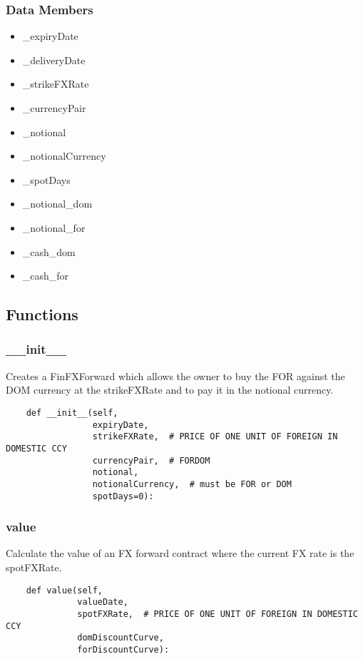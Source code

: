 \documentclass[twoside,11pt]{book}
\begin{document}
\subsubsection*{Data Members}
\begin{itemize}
\item{\_expiryDate}
\item{\_deliveryDate}
\item{\_strikeFXRate}
\item{\_currencyPair}
\item{\_notional}
\item{\_notionalCurrency}
\item{\_spotDays}
\item{\_notional\_dom}
\item{\_notional\_for}
\item{\_cash\_dom}
\item{\_cash\_for}
\end{itemize}

\subsection*{Functions}

\subsubsection*{{\bf \_\_init\_\_}}
Creates a FinFXForward which allows the owner to buy the FOR against the DOM currency at the strikeFXRate and to pay it in the notional currency.  

\begin{lstlisting}
    def __init__(self,
                 expiryDate,
                 strikeFXRate,  # PRICE OF ONE UNIT OF FOREIGN IN DOMESTIC CCY
                 currencyPair,  # FORDOM
                 notional,
                 notionalCurrency,  # must be FOR or DOM
                 spotDays=0):
\end{lstlisting}

\subsubsection*{{\bf value}}
Calculate the value of an FX forward contract where the current FX rate is the spotFXRate.  

\begin{lstlisting}
    def value(self,
              valueDate,
              spotFXRate,  # PRICE OF ONE UNIT OF FOREIGN IN DOMESTIC CCY
              domDiscountCurve,
              forDiscountCurve):
\end{lstlisting}
\end{document}
